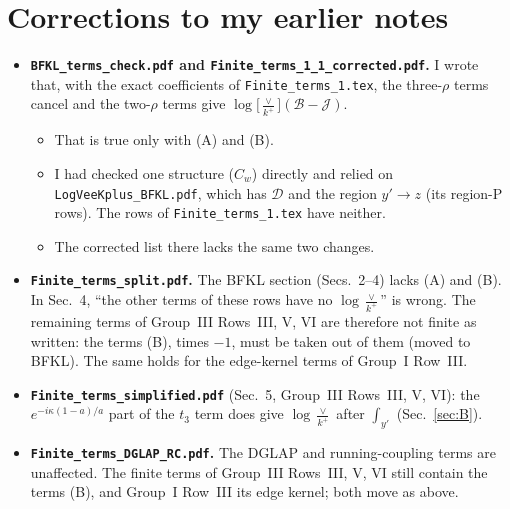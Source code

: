 \documentclass[10pt]{article}
\numberwithin{equation}{section}
\newcommand{\BB}{\mathcal B}
\newcommand{\JJ}{\mathcal J}
\newcommand{\Lv}{\log\Big[\frac{\vee}{k^+}\Big]}
\begin{document}
\section{Corrections to my earlier notes}\label{sec:corr}
\begin{itemize}
\item \textbf{\texttt{BFKL\_terms\_check.pdf} and \texttt{Finite\_terms\_1\_1\_corrected.pdf}.} I wrote that, with the exact coefficients of \texttt{Finite\_terms\_1.tex}, the three-$\rho$ terms cancel and the two-$\rho$ terms give $\Lv(\BB-\JJ)$.
\begin{itemize}
\item That is true only with (A) and (B).
\item I had checked one structure ($C_w$) directly and relied on \texttt{LogVeeKplus\_BFKL.pdf}, which has $\mathcal D$ and the region $y'\to z$ (its region-P rows). The rows of \texttt{Finite\_terms\_1.tex} have neither.
\item The corrected list there lacks the same two changes.
\end{itemize}
\item \textbf{\texttt{Finite\_terms\_split.pdf}.} The BFKL section (Secs.~2--4) lacks (A) and (B). In Sec.~4, ``the other terms of these rows have no $\log\frac{\vee}{k^+}$'' is wrong. The remaining terms of Group~III Rows~III, V, VI are therefore not finite as written: the terms (B), times $-1$, must be taken out of them (moved to BFKL). The same holds for the edge-kernel terms of Group~I Row~III.
\item \textbf{\texttt{Finite\_terms\_simplified.pdf}} (Sec.~5, Group~III Rows~III, V, VI): the $e^{-i\kappa(1-a)/a}$ part of the $t_3$ term does give $\log\frac{\vee}{k^+}$ after $\int_{y'}$ (Sec.~\ref{sec:B}).
\item \textbf{\texttt{Finite\_terms\_DGLAP\_RC.pdf}.} The DGLAP and running-coupling terms are unaffected. The finite terms of Group~III Rows~III, V, VI still contain the terms (B), and Group~I Row~III its edge kernel; both move as above.
\end{itemize}

\end{document}
